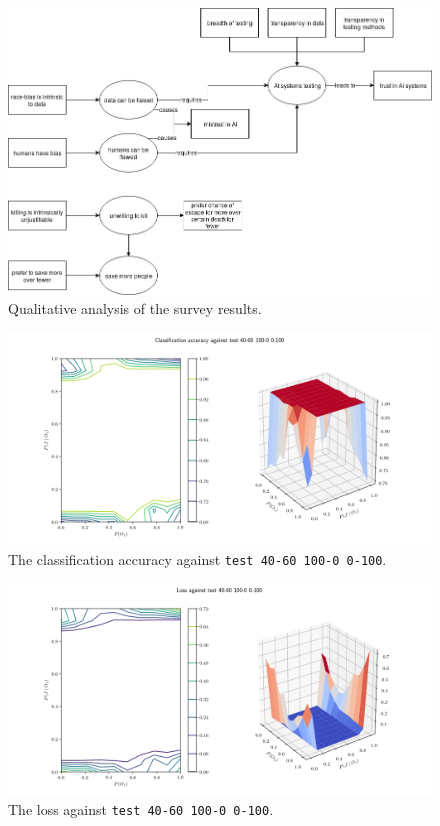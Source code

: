 \documentclass[paper=a4paper]{report}
\newcommand{\code}{\texttt}
\begin{document}
\begin{figure}[h]
    \centering
    \includegraphics[scale=0.46]{figures/moral_ai_survey_analysis.jpg}
    \caption[]{Qualitative analysis of the survey results.}
    \label{fig:survey_analysis}
\end{figure}

% 
% 

\begin{figure}[h]
    \centering
    \centerline{\includegraphics[scale=0.55]{test_40-60_100-0_0-100_accuracy.png}}
    \caption[]{The classification accuracy against \code{test 40-60 100-0 0-100}.}
    \label{fig:test_40-60_100-0_0-100_accuracy_plot}
\end{figure}

\begin{figure}[h]
    \centering
    \centerline{\includegraphics[scale=0.55]{test_40-60_100-0_0-100_loss.png}}
    \caption[]{The loss against \code{test 40-60 100-0 0-100}.}
    \label{fig:test_40-60_100-0_0-100_loss_plot}
\end{figure}
\end{document}
